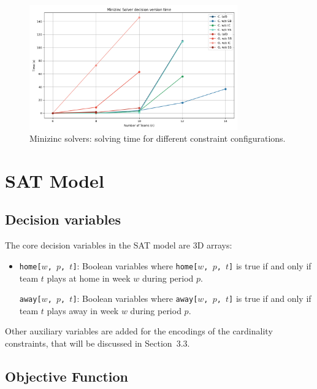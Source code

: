 \documentclass[11pt]{article}
\begin{document}
\begin{figure}[H]
    \centering
    \includegraphics[width=0.8\textwidth]{cp_plot.png}
    \caption{Minizinc solvers: solving time for different constraint configurations.}
    \label{fig:cp_plot}
\end{figure}

\section{SAT Model}

\subsection{Decision variables}
The core decision variables in the SAT model are 3D arrays: 
\begin{itemize}
    \item \texttt{home[$w$, $p$, $t$]}: Boolean variables where \texttt{home[$w$, $p$, $t$]} is true if and only if team $t$ plays at home in week $w$ during period $p$.

\texttt{away[$w$, $p$, $t$]}: Boolean variables where \texttt{away[$w$, $p$, $t$]} is true if and only if team $t$ plays away in week $w$ during period $p$.
\end{itemize}
Other auxiliary variables are added for the encodings of the cardinality constraints, that will be discussed in Section~3.3.

\subsection{Objective Function}
\end{document}
